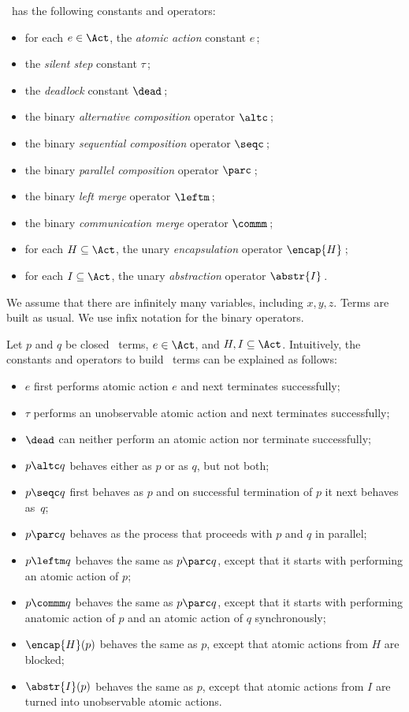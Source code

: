\documentclass[fleqn]{llncs}
\begin{document}
\ACPt\ has the following constants and operators:
\begin{itemize}
\item
for each $e \in \Act$, the \emph{atomic action} constant $e$\,;
\item
the \emph{silent step} constant $\tau$\,;
\item
the \emph{deadlock} constant $\dead$\,;
\item
the binary \emph{alternative composition} operator $\altc$\,;
\item
the binary \emph{sequential composition} operator $\seqc$\,;
\item
the binary \emph{parallel composition} operator $\parc$\,;
\item
the binary \emph{left merge} operator $\leftm$\,;
\item
the binary \emph{communication merge} operator $\commm$\,;
\item
for each $H \subseteq \Act$, the unary \emph{encapsulation} operator
$\encap{H}$\,;
\item
for each $I \subseteq \Act$, the unary \emph{abstraction} operator
$\abstr{I}$\,.
\end{itemize}
We assume that there are infinitely many variables, including $x,y,z$.
Terms are built as usual.
We use infix notation for the binary operators.

Let $p$ and $q$ be closed \ACPt\ terms, $e \in \Act$, and
$H,I \subseteq \Act$.
Intuitively, the constants and operators to build \ACPt\ terms can be
explained as follows:
\begin{itemize}
\item
$e$ first performs atomic action $e$ and next terminates successfully;
\item
$\tau$ performs an unobservable atomic action and next terminates
successfully;
\item
$\dead$ can neither perform an atomic action nor terminate successfully;
\item
$p \altc q$ behaves either as $p$ or as $q$, but not both;
\item
$p \seqc q$ first behaves as $p$ and on successful termination of $p$
it next behaves as~$q$;
\item
$p \parc q$ behaves as the process that proceeds with $p$ and $q$ in
parallel;
\item
$p \leftm q$ behaves the same as $p \parc q$, except that it starts
with performing an atomic action of $p$;
\item
$p \commm q$ behaves the same as $p \parc q$, except that it starts with
performing an\linebreak[2] atomic action of $p$ and an atomic action of
$q$ synchronously;
\item
$\encap{H}(p)$ behaves the same as $p$, except that atomic actions from
$H$ are blocked;
\item
$\abstr{I}(p)$ behaves the same as $p$, except that atomic actions from
$I$ are turned into unobservable atomic actions.
\end{itemize}
\begin{comment}
The operators $\leftm$ and $\commm$ are of an auxiliary nature.
They are needed to axiomatize \ACPt.
\end{comment}
\end{document}
